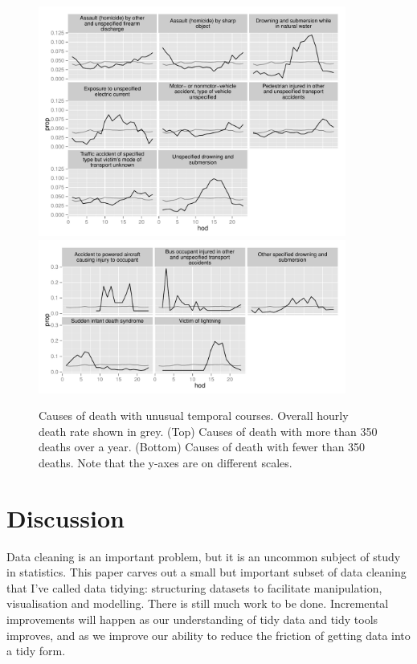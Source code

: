 \documentclass[article]{jss}
\begin{document}
\begin{figure}[htbp]
  \centering
    \includegraphics[width=0.9\textwidth]{case-study/unusual-big}
    \includegraphics[width=0.9\textwidth]{case-study/unusual-sml}
  \caption{Causes of death with unusual temporal courses. Overall hourly death rate shown in grey. (Top) Causes of death with more than 350 deaths over a year. (Bottom) Causes of death with fewer than 350 deaths. Note that the y-axes are on different scales.}
  \label{fig:disease}
\end{figure}

\section{Discussion}
\label{sec:discussion}

Data cleaning is an important problem, but it is an uncommon subject of study in statistics. This paper carves out a small but important subset of data cleaning that I've called data tidying: structuring datasets to facilitate manipulation, visualisation and modelling. There is still much work to be done. Incremental improvements will happen as our understanding of tidy data and tidy tools improves, and as we improve our ability to reduce the friction of getting data into a tidy form.
\end{document}
